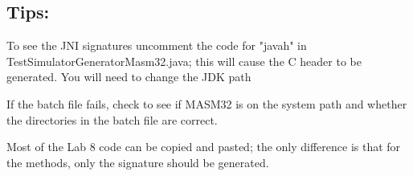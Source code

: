 \subsection{Tips:}

\biTight

\item To see the JNI signatures uncomment the code for "javah" in TestSimulatorGeneratorMasm32.java; this will cause the C header to be generated. You will need to change the JDK path

\item If the batch file fails, check to see if MASM32 is on the system path and whether the directories in the batch file are correct.

\item Most of the Lab 8 code can be copied and pasted; the only difference is that for the methods, only the signature should be generated.

\ei
